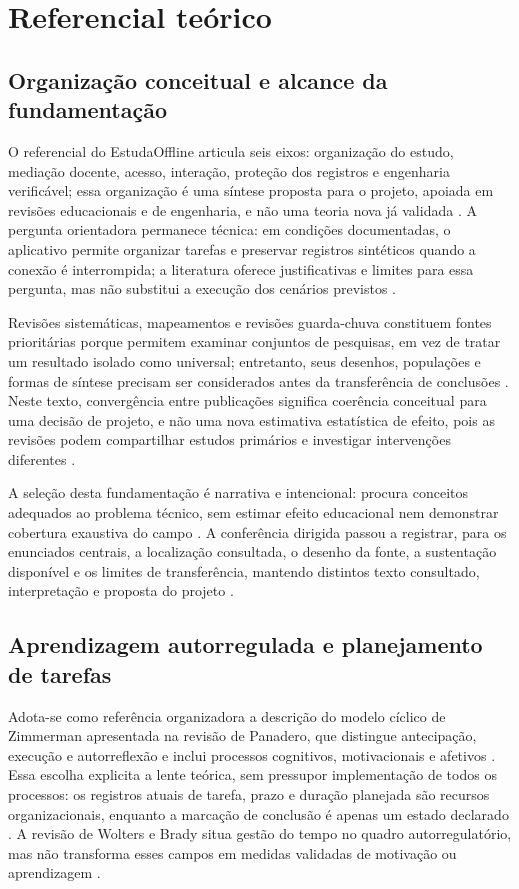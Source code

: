 \clearpage
\section{Referencial teórico}\label{sec:referencial-inicio}
\subsection{Organização conceitual e alcance da fundamentação}
O referencial do EstudaOffline articula seis eixos: organização do estudo, mediação docente, acesso, interação, proteção dos registros e engenharia verificável; essa organização é uma síntese proposta para o projeto, apoiada em revisões educacionais e de engenharia, e não uma teoria nova já validada \citep{education_palalas2020,eng04}.
A pergunta orientadora permanece técnica: em condições documentadas, o aplicativo permite organizar tarefas e preservar registros sintéticos quando a conexão é interrompida; a literatura oferece justificativas e limites para essa pergunta, mas não substitui a execução dos cenários previstos \citep{eng06}.

Revisões sistemáticas, mapeamentos e revisões guarda-chuva constituem fontes prioritárias porque permitem examinar conjuntos de pesquisas, em vez de tratar um resultado isolado como universal; entretanto, seus desenhos, populações e formas de síntese precisam ser considerados antes da transferência de conclusões \citep{education_prasse2024,eng04}.
Neste texto, convergência entre publicações significa coerência conceitual para uma decisão de projeto, e não uma nova estimativa estatística de efeito, pois as revisões podem compartilhar estudos primários e investigar intervenções diferentes \citep{education_prasse2024,education_palalas2020}.


A seleção desta fundamentação é narrativa e intencional: procura conceitos adequados ao problema técnico, sem estimar efeito educacional nem demonstrar cobertura exaustiva do campo \citep{SU11}.
A conferência dirigida passou a registrar, para os enunciados centrais, a localização consultada, o desenho da fonte, a sustentação disponível e os limites de transferência, mantendo distintos texto consultado, interpretação e proposta do projeto \citep{SU11}.

\subsection{Aprendizagem autorregulada e planejamento de tarefas}
Adota-se como referência organizadora a descrição do modelo cíclico de Zimmerman apresentada na revisão de Panadero, que distingue antecipação, execução e autorreflexão e inclui processos cognitivos, motivacionais e afetivos \citep{SU10}.
Essa escolha explicita a lente teórica, sem pressupor implementação de todos os processos: os registros atuais de tarefa, prazo e duração planejada são recursos organizacionais, enquanto a marcação de conclusão é apenas um estado declarado \citep{SU10}.
A revisão de Wolters e Brady situa gestão do tempo no quadro autorregulatório, mas não transforma esses campos em medidas validadas de motivação ou aprendizagem \citep{education_wolters2021}.

